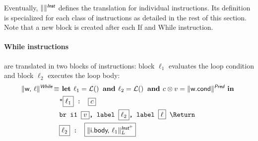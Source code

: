 \documentclass{llncs}
\newcommand{\trad}[2]{\ensuremath{\lVert \textsf{#1} \rVert^{\textit{#2}}}}
\newcommand{\nl}[0]{\text{\Return}}
\DeclareMathOperator{\isdef}{\equiv}
\DeclareMathOperator{\lbl}{\mathcal{L}()}
\newcommand{\llvm}[1]{\texttt{#1}}
\newcommand{\B}[1]{\textsf{#1}}
\newcommand{\ListOf}[1]{$\mbox{#1}^+$}
\newcommand{\LET}[0]{\textbf{ let }}
\newcommand{\IN}[0]{\textbf{ in }}
\newcommand{\AND}[0]{\textbf{ and }}
\newcommand{\PH}[1]{\framebox{$#1$}}
\newcommand{\sep}[0]{\otimes}
\begin{document}
Eventually, $\trad{}{\B{Inst}}$ defines the translation for individual
instructions. Its definition is specialized for each class of instructions as
detailed in the rest of this section. Note that a new block is created after
each \B{If} and \B{While} instruction.

\paragraph{While instructions} are translated in two blocks of instructions:
block $\ell_1$ evaluates the loop condition and block $\ell_2$ executes the loop
body:
\begin{align*}
\begin{split}
\trad{w, $\ell$}{\B{While}} \isdef 
  & \LET \ell_1 = \lbl \AND \ell_2 = \lbl \AND c \sep v = \trad{w.cond}{\B{Pred}} \IN \\
  & \llvm{"\PH{\ell_1} : \PH{c}} \\
  & \llvm{br i1 \PH{v}, label \PH{\ell_2}, label \PH{\ell} \nl} \\
  & \llvm{\PH{\ell_2} : \PH{\trad{i.body, $\ell_1$}{\ListOf{\B{Inst}}}_L}}
\end{split}
\end{align*}
\end{document}
